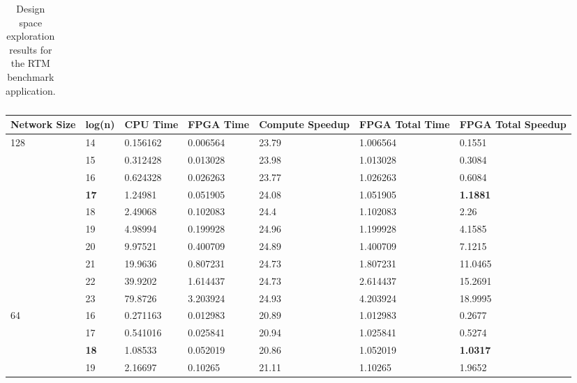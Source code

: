\begin{sidewaystable}
\begin{tabularx}{\textheight}{p{3.5cm}|X|X|X|X|X|X|X|X|X|X|X|X|p{1cm}|}
    \end{tabularx}
    \caption{Design space exploration results for the RTM benchmark application.}
    \label{table:rtm-dse}
  \end{sidewaystable}

\begin{table}
  \renewcommand{\arraystretch}{1.1}
  \begin{tabularx}{\textwidth}{X|X|X|X|X|X|X}
    \hline
    \textbf{Network Size}        & \textbf{log(n)}      & \textbf{CPU Time} & \textbf{FPGA Time} & \textbf{Compute Speedup} & \textbf{FPGA Total Time} & \textbf{FPGA Total Speedup} \\
    \hline \hline
    \multirow{10}{*}{128}   & 14          & 0.156162 & 0.006564  & 23.79           & 1.006564        & 0.1551             \\
    & 15          & 0.312428 & 0.013028  & 23.98           & 1.013028        & 0.3084             \\
    & 16          & 0.624328 & 0.026263  & 23.77           & 1.026263        & 0.6084             \\
    & \textbf{17} & 1.24981  & 0.051905  & 24.08           & 1.051905        & \textbf{1.1881}    \\
    & 18          & 2.49068  & 0.102083  & 24.4            & 1.102083        & 2.26               \\
    & 19          & 4.98994  & 0.199928  & 24.96           & 1.199928        & 4.1585             \\
    & 20          & 9.97521  & 0.400709  & 24.89           & 1.400709        & 7.1215             \\
    & 21          & 19.9636  & 0.807231  & 24.73           & 1.807231        & 11.0465            \\
    & 22          & 39.9202  & 1.614437  & 24.73           & 2.614437        & 15.2691            \\
    & 23          & 79.8726  & 3.203924  & 24.93           & 4.203924        & 18.9995            \\
    \hline
    \multirow{8}{*}{64} & 16          & 0.271163 & 0.012983  & 20.89           & 1.012983        & 0.2677             \\
    & 17          & 0.541016 & 0.025841  & 20.94           & 1.025841        & 0.5274             \\
    & \textbf{18} & 1.08533  & 0.052019  & 20.86           & 1.052019        & \textbf{1.0317}    \\
    & 19          & 2.16697  & 0.10265   & 21.11           & 1.10265         & 1.9652             \\

\end{tabularx}
\end{table}
